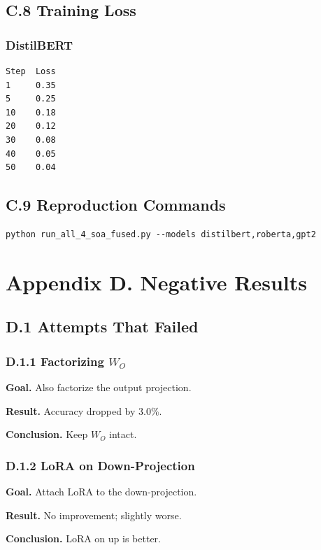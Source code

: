 \subsection{C.8 Training Loss}

\subsubsection{DistilBERT}
\begin{lstlisting}
Step  Loss
1     0.35
5     0.25
10    0.18
20    0.12
30    0.08
40    0.05
50    0.04
\end{lstlisting}

\subsection{C.9 Reproduction Commands}

\begin{lstlisting}
python run_all_4_soa_fused.py --models distilbert,roberta,gpt2
\end{lstlisting}



\section{Appendix D. Negative Results}

\subsection{D.1 Attempts That Failed}

\subsubsection{D.1.1 Factorizing $W_O$}

\textbf{Goal.} Also factorize the output projection.

\textbf{Result.} Accuracy dropped by 3.0\%.

\textbf{Conclusion.} Keep $W_O$ intact.

\subsubsection{D.1.2 LoRA on Down-Projection}

\textbf{Goal.} Attach LoRA to the down-projection.

\textbf{Result.} No improvement; slightly worse.

\textbf{Conclusion.} LoRA on up is better.

